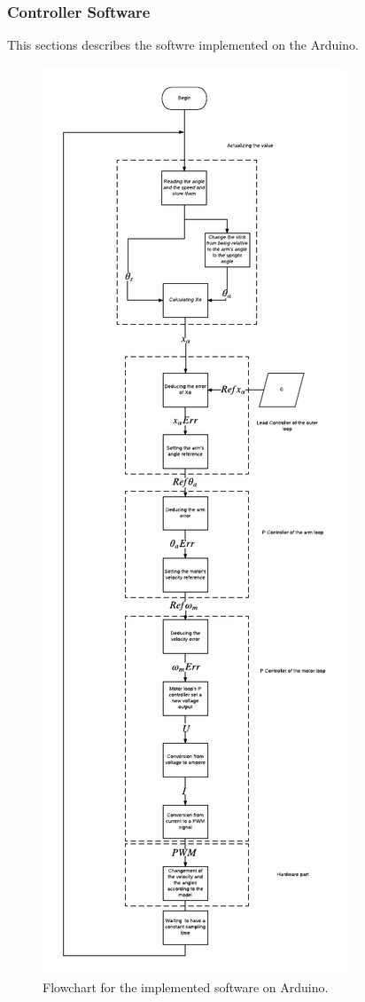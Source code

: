 \subsubsection{Controller Software}
This sections describes the softwre implemented on the Arduino. 
\begin{figure}[htbp]
\centering
\includegraphics[width=1\linewidth]{figures/Flowchart.pdf}
\caption{Flowchart for the implemented software on Arduino.}
\label{fig:Flowchart}
\end{figure}
\newpage
